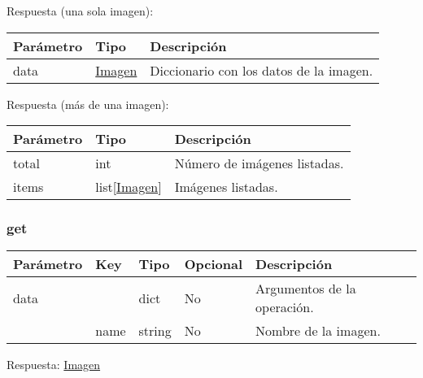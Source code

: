 				Respuesta (una sola imagen):
				\begin{table}[h!]
					\centering
	\begin{adjustbox}{max width=\textwidth}
					\begin{tabular}{|l|l|l|}
						\hline
						Parámetro & Tipo & Descripción \\ \hline
						data & \hyperref[sec:imagen]{Imagen} & Diccionario con los datos de la imagen. \\ \hline
					\end{tabular}
\end{adjustbox}
				\end{table}
			
				Respuesta (más de una imagen):
				\begin{table}[h!]
					\centering
	\begin{adjustbox}{max width=\textwidth}
					\begin{tabular}{|l|l|l|}
						\hline
						Parámetro & Tipo & Descripción \\ \hline
						total & int & Número de imágenes listadas. \\ \hline
						items & list[\hyperref[sec:imagen]{Imagen}] & Imágenes listadas. \\ \hline
					\end{tabular}
\end{adjustbox}
				\end{table}
			
			\pagebreak
			\subsubsection{get}
				\begin{table}[h!]
					\centering
	\begin{adjustbox}{max width=\textwidth}
					\begin{tabular}{|l|l|l|l|l|}
						\hline
						Parámetro & Key & Tipo & Opcional & Descripción \\ \hline
						data &  & dict & No & Argumentos de la operación. \\ \hline
						& name & string & No & Nombre de la imagen. \\ \hline
					\end{tabular}
\end{adjustbox}
				\end{table}
			
				Respuesta: \hyperref[sec:imagen]{Imagen}
				
